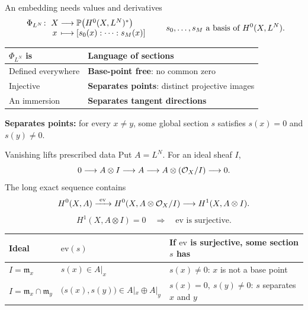 \begin{frame}{An embedding needs values and derivatives}
\label{fr:an-embedding-needs-values-10}
\[
\begin{array}{r@{\;}c@{\;}c@{\;}l}
\Phi_{L^N}\colon & X & \longrightarrow & \Pj\bigl(H^0(X,L^N)^*\bigr)\\
& x & \longmapsto & [s_0(x):\cdots:s_M(x)]
\end{array}
\qquad s_0,\ldots,s_M \text{ a basis of } H^0(X,L^N).
\]
\begin{center}
\renewcommand{\arraystretch}{1.4}
\begin{tabular}{ll}
\(\Phi_{L^N}\) is & Language of sections\\
\hline
Defined everywhere & \textbf{Base-point free}: no common zero\\
Injective & \textbf{Separates points}: distinct projective images\\
An immersion & \textbf{Separates tangent directions}
\end{tabular}
\end{center}
\textbf{Separates points:} for every \(x\ne y\), some global section \(s\) satisfies \(s(x)=0\) and \(s(y)\ne0\).
\end{frame}

\begin{frame}{Vanishing lifts prescribed data}
Put \(A=L^N\). For an ideal sheaf \(I\),
\[
0\longrightarrow A\otimes I\longrightarrow A
\longrightarrow A\otimes(\mathcal O_X/I)\longrightarrow0.
\]
The long exact sequence contains
\[
H^0(X,A)\xrightarrow{\ \mathrm{ev}\ } H^0(X,A\otimes\mathcal O_X/I)
\longrightarrow H^1(X,A\otimes I).
\]
\[
\boxed{H^1(X,A\otimes I)=0
\quad\Longrightarrow\quad\mathrm{ev}\text{ is surjective}.}
\]
\begin{center}
\renewcommand{\arraystretch}{1.5}
\begin{tabular}{lll}
Ideal & \(\mathrm{ev}(s)\) & If \(\mathrm{ev}\) is surjective, some section \(s\) has\\
\hline
\(I=\mathfrak m_x\) & \(s(x)\in A|_x\) & \(s(x)\ne0\): \(x\) is not a base point\\
\(I=\mathfrak m_x\cap\mathfrak m_y\) & \(\bigl(s(x),s(y)\bigr)\in A|_x\oplus A|_y\) & \(s(x)=0,\ s(y)\ne0\): \(s\) separates \(x\) and \(y\)
\end{tabular}
\end{center}
\end{frame}

